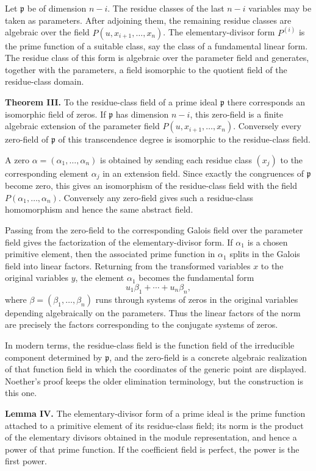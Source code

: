 \documentclass[11pt]{article}
\begin{document}
Let $\mathfrak p$ be of dimension $n-i$. The residue classes of the last $n-i$ variables may be taken as parameters. After adjoining them, the remaining residue classes are algebraic over the field $P(u,x_{i+1},\ldots,x_n)$. The elementary-divisor form $P^{(i)}$ is the prime function of a suitable class, say the class of a fundamental linear form. The residue class of this form is algebraic over the parameter field and generates, together with the parameters, a field isomorphic to the quotient field of the residue-class domain.

\textbf{Theorem III.} To the residue-class field of a prime ideal $\mathfrak p$ there corresponds an isomorphic field of zeros. If $\mathfrak p$ has dimension $n-i$, this zero-field is a finite algebraic extension of the parameter field $P(u,x_{i+1},\ldots,x_n)$. Conversely every zero-field of $\mathfrak p$ of this transcendence degree is isomorphic to the residue-class field.

A zero $\alpha=(\alpha_1,\ldots,\alpha_n)$ is obtained by sending each residue class $(x_j)$ to the corresponding element $\alpha_j$ in an extension field. Since exactly the congruences of $\mathfrak p$ become zero, this gives an isomorphism of the residue-class field with the field $P(\alpha_1,\ldots,\alpha_n)$. Conversely any zero-field gives such a residue-class homomorphism and hence the same abstract field.

Passing from the zero-field to the corresponding Galois field over the parameter field gives the factorization of the elementary-divisor form. If $\alpha_1$ is a chosen primitive element, then the associated prime function in $\alpha_1$ splits in the Galois field into linear factors. Returning from the transformed variables $x$ to the original variables $y$, the element $\alpha_1$ becomes the fundamental form
\[
  u_1\beta_1+\cdots+u_n\beta_n,
\]
where $\beta=(\beta_1,\ldots,\beta_n)$ runs through systems of zeros in the original variables depending algebraically on the parameters. Thus the linear factors of the norm are precisely the factors corresponding to the conjugate systems of zeros.

In modern terms, the residue-class field is the function field of the irreducible component determined by $\mathfrak p$, and the zero-field is a concrete algebraic realization of that function field in which the coordinates of the generic point are displayed. Noether's proof keeps the older elimination terminology, but the construction is this one.

\textbf{Lemma IV.} The elementary-divisor form of a prime ideal is the prime function attached to a primitive element of its residue-class field; its norm is the product of the elementary divisors obtained in the module representation, and hence a power of that prime function. If the coefficient field is perfect, the power is the first power.
\end{document}
